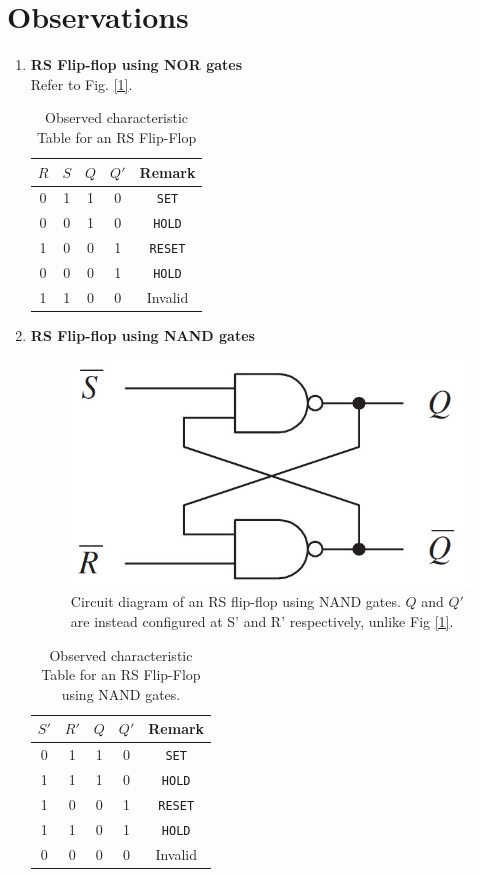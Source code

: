 \section{Observations}

\begin{enumerate}
    \item \textbf{RS Flip-flop using NOR gates}\\
    Refer to Fig. \ref{1}.
    \begin{table}[H]
        \centering
        \begin{tabular}{|c|c|c|c|c|}\hline
            $R$ & $S$ & $Q$ & $Q'$ & Remark \\ \hline
            0 & 1 & 1 & 0 & \verb|SET| \\ 
            0 & 0 & 1 & 0 & \verb|HOLD| \\ 
            1 & 0 & 0 & 1 & \verb|RESET| \\ 
            0 & 0 & 0 & 1 & \verb|HOLD| \\ 
            1 & 1 & 0 & 0 & Invalid \\ \hline
        \end{tabular}
        \caption{Observed characteristic Table for an RS Flip-Flop}
    \end{table}

    \item \textbf{RS Flip-flop using NAND gates}\\
    
    \begin{figure}[H]
        \centering
        \includegraphics[width=0.50\columnwidth]{images/rsnand.jpg}
        \caption{Circuit diagram of an RS flip-flop using NAND gates. $Q$ and $Q'$ are instead configured at S' and R' respectively, unlike Fig \ref{1}.}
    \end{figure}

    \begin{table}[H]
        \centering
        \begin{tabular}{|c|c|c|c|c|}\hline
            $S'$ & $R'$ & $Q$ & $Q'$ & Remark \\ \hline
            0 & 1 & 1 & 0 & \verb|SET| \\ 
            1 & 1 & 1 & 0 & \verb|HOLD| \\ 
            1 & 0 & 0 & 1 & \verb|RESET| \\ 
            1 & 1 & 0 & 1 & \verb|HOLD| \\ 
            0 & 0 & 0 & 0 & Invalid \\ \hline
        \end{tabular}
        \caption{Observed characteristic Table for an RS Flip-Flop using NAND gates.}
    \end{table}


\end{enumerate}
